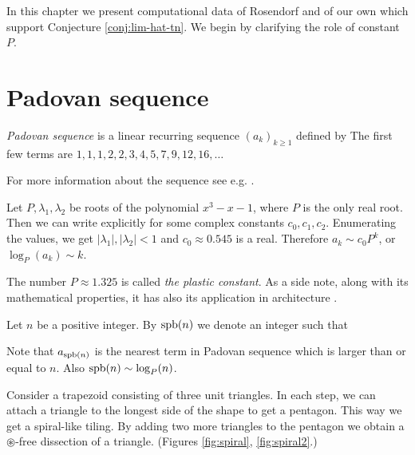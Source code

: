 In this chapter we present computational data of Rosendorf \cite{Rosendorf04} and of our own which support Conjecture \ref{conj:lim-hat-tn}. We begin by clarifying the role of constant $P$.


\section{Padovan sequence}

\begin{defn}
\emph{Padovan sequence} is a linear recurring sequence $(a_k)_{k \geq 1}$ defined by
%
The first few terms are $1, 1, 1, 2, 2, 3, 4, 5, 7, 9, 12, 16,\dots$
\end{defn}

For more information about the sequence see e.g. \cite{OEIS}.

Let $P, \lambda_1, \lambda_2$ be roots of the polynomial $x^3-x-1$, where $P$ is the only real root. Then we can write explicitly
%
for some complex constants $c_0,c_1,c_2$. Enumerating the values, we get $|\lambda_1|, |\lambda_2| < 1$ and $c_0 \approx 0.545$ is a real. Therefore $a_k \sim c_0P^k$, or $\log_P(a_k) \sim k$.

The number $P \approx 1.325$ is called \emph{the plastic constant}. As a side note, along with its mathematical properties, it has also its application in architecture \cite{Stewart96}.

\begin{defn}
Let $n$ be a positive integer. By $\mathop{\mathrm{spb}}(n)$ we denote an integer such that
\end{defn}

Note that $a_{\mathop{\mathrm{spb}}(n)}$ is the nearest term in Padovan sequence which is larger than or equal to $n$. Also $\mathop{\mathrm{spb}}(n) \sim \log_P(n)$.

\bigskip

Consider a trapezoid consisting of three unit triangles. In each step, we can attach a triangle to the longest side of the shape to get a pentagon. This way we get a spiral-like tiling. By adding two more triangles to the pentagon we obtain a $\circledast$-free dissection of a triangle. (Figures \ref{fig:spiral}, \ref{fig:spiral2}.)

